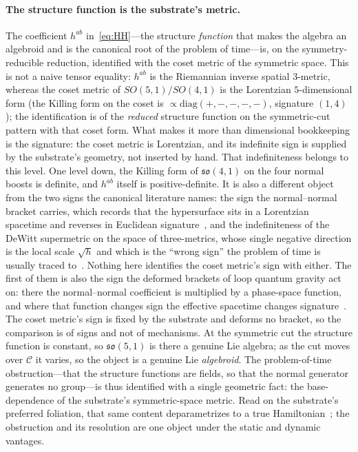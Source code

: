 \documentclass[11pt,a4paper]{article}
\theoremstyle{plain}
\theoremstyle{definition}
\theoremstyle{remark}
\newcommand{\so}{\mathfrak{so}}
\newcommand{\C}{\mathcal{C}}
\begin{document}
\paragraph{The structure function is the substrate's metric.}
The coefficient $h^{ab}$ in~\eqref{eq:HH}---the structure \emph{function} that makes the algebra an algebroid and is the canonical root of the problem of time---is, on the symmetry-reducible reduction, identified with the coset metric of the symmetric space. This is not a naive tensor equality: $h^{ab}$ is the Riemannian inverse spatial $3$-metric, whereas the coset metric of $SO(5,1)/SO(4,1)$ is the Lorentzian $5$-dimensional form (the Killing form on the coset is $\propto\mathrm{diag}(+,-,-,-,-)$, signature $(1,4)$); the identification is of the \emph{reduced} structure function on the symmetric-cut pattern with that coset form. What makes it more than dimensional bookkeeping is the signature: the coset metric is Lorentzian, and its indefinite sign is supplied by the substrate's geometry, not inserted by hand. That indefiniteness belongs to this level. One level down, the Killing form of $\so(4,1)$ on the four normal boosts is definite, and $h^{ab}$ itself is positive-definite. It is also a different object from the two signs the canonical literature names: the sign the normal--normal bracket carries, which records that the hypersurface sits in a Lorentzian spacetime and reverses in Euclidean signature~\cite{Teitelboim1973}, and the indefiniteness of the DeWitt supermetric on the space of three-metrics, whose single negative direction is the local scale $\sqrt{h}$ and which is the ``wrong sign'' the problem of time is usually traced to~\cite{DeWitt1967,Kiefer2020}. Nothing here identifies the coset metric's sign with either. The first of them is also the sign the deformed brackets of loop quantum gravity act on: there the normal--normal coefficient is multiplied by a phase-space function, and where that function changes sign the effective spacetime changes signature~\cite{BBBD2016,BojowaldBrahma2020}. The coset metric's sign is fixed by the substrate and deforms no bracket, so the comparison is of signs and not of mechanisms. At the symmetric cut the structure function is constant, so $\so(5,1)$ is there a genuine Lie algebra; as the cut moves over $\C$ it varies, so the object is a genuine Lie \emph{algebroid}. The problem-of-time obstruction---that the structure functions are fields, so that the normal generator generates no group---is thus identified with a single geometric fact: the base-dependence of the substrate's symmetric-space metric. Read on the substrate's preferred foliation, that same content deparametrizes to a true Hamiltonian~\cite{JanzenCanonicalTime}; the obstruction and its resolution are one object under the static and dynamic vantages.
\end{document}
